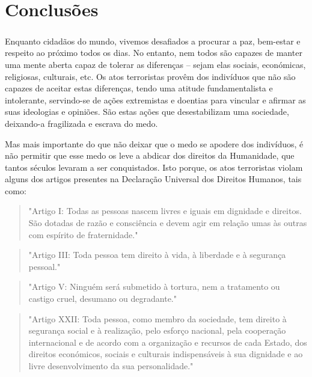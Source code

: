 \documentclass{report}
\begin{document}
\chapter{Conclusões}
\label{chap.conclusao}
\paragraph{} Enquanto cidadãos do mundo, vivemos desafiados a procurar a paz, bem-estar e respeito ao próximo todos os dias. No entanto, nem todos são capazes de manter uma mente aberta capaz de tolerar as diferenças – sejam elas sociais, económicas, religiosas, culturais, etc. Os atos terroristas provêm dos indivíduos que não são capazes de aceitar estas diferenças, tendo uma atitude fundamentalista e intolerante, servindo-se de ações extremistas e doentias para vincular e afirmar as suas ideologias e opiniões. São estas ações que desestabilizam uma sociedade, deixando-a fragilizada e escrava do medo.\par
Mas mais importante do que não deixar que o medo se apodere dos indivíduos, é não permitir que esse medo os leve a abdicar dos direitos da Humanidade, que tantos séculos levaram a ser conquistados. Isto porque, os atos terroristas violam alguns dos artigos presentes na Declaração Universal dos Direitos Humanos, tais como:
\begin {quotation}
"Artigo I: Todas as pessoas nascem livres e iguais em dignidade e direitos. São dotadas de razão e consciência e devem agir em relação umas às outras com espírito de fraternidade."
\end {quotation}

\begin {quotation}
"Artigo III: Toda pessoa tem direito à vida, à liberdade e à segurança pessoal."
\end {quotation}
   		 
\begin {quotation}
"Artigo V: Ninguém será submetido à tortura, nem a tratamento ou castigo cruel, desumano ou degradante."
\end {quotation}	 
   		
\begin {quotation}
"Artigo XXII: Toda pessoa, como membro da sociedade, tem direito à segurança social e à realização, pelo esforço nacional, pela cooperação internacional e de acordo com a organização e recursos de cada Estado, dos direitos económicos, sociais e culturais indispensáveis à sua dignidade e ao livre desenvolvimento da sua personalidade."
\end {quotation}
 
\end{document}
